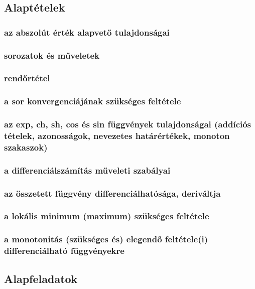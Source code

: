 \documentclass[12pt]{article}
\begin{document}
\subsection{Alaptételek}

\subsubsection{az abszolút érték alapvető tulajdonságai}
\subsubsection{sorozatok és műveletek}
\subsubsection{rendőrtétel}
\subsubsection{a sor konvergenciájának szükséges feltétele}
\subsubsection{az exp, ch, sh, cos és sin függvények tulajdonságai (addíciós tételek, azonosságok, nevezetes határértékek, monoton szakaszok)}
\subsubsection{a differenciálszámítás műveleti szabályai}
\subsubsection{az összetett függvény differenciálhatósága, deriváltja}
\subsubsection{a lokális minimum (maximum) szükséges feltétele}
\subsubsection{a monotonitás (szükséges és) elegendő feltétele(i) differenciálható függvényekre}
 



\subsection{Alapfeladatok}
\end{document}
